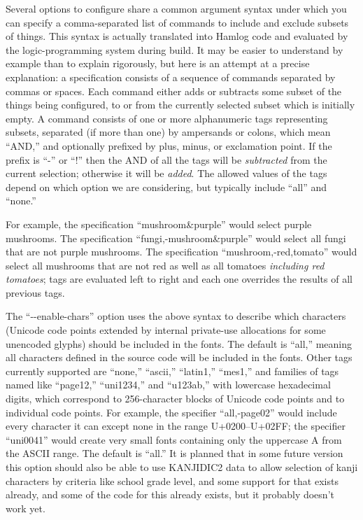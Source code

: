 \documentclass[14pt]{extarticle}
\begin{document}
Several options to configure share a common argument syntax under which you
can specify a comma-separated list of commands to include and exclude
subsets of things.  This syntax is actually translated into Hamlog code and
evaluated by the logic-programming system during build.  It may be easier
to understand by example than to explain rigorously, but here is an attempt
at a precise explanation: a specification consists of a sequence of commands
separated by commas or spaces.  Each command either adds or subtracts some
subset of the things being configured, to or from the currently selected
subset which is initially empty.  A command consists of one or more
alphanumeric tags representing subsets, separated (if more than one) by
ampersands or colons, which mean ``AND,'' and optionally prefixed by plus,
minus, or exclamation point.  If the prefix is ``-'' or ``!'' then the AND
of all the tags will be \emph{subtracted} from the current selection;
otherwise it will be \emph{added}.  The allowed values of the tags depend on
which option we are considering, but typically include ``all'' and ``none.''

For example, the specification ``mushroom\&purple'' would select purple
mushrooms.  The specification ``fungi,-mushroom\&purple'' would select all
fungi that are not purple mushrooms.  The specification
``mushroom,-red,tomato'' would select all mushrooms that are not red as well
as all tomatoes \emph{including red tomatoes}; tags are evaluated left to
right and each one overrides the results of all previous tags.

The ``-{}-enable-chars'' option uses the above syntax to describe which
characters (Unicode code points extended by internal private-use allocations
for some unencoded glyphs) should be included in the fonts.  The default is
``all,'' meaning all characters defined in the source code will be included
in the fonts.  Other tags currently supported are ``none,'' ``ascii,''
``latin1,'' ``mes1,'' and families of tags named like ``page12,''
``uni1234,'' and ``u123ab,'' with lowercase hexadecimal digits, which
correspond to 256-character blocks of Unicode code points and to individual
code points.  For example, the specifier ``all,-page02'' would include every
character it can except none in the range U+0200--U+02FF; the specifier
``uni0041'' would create very small fonts containing only the uppercase A
from the ASCII range.  The default is ``all.'' It is planned that in some
future version this option should also be able to use KANJIDIC2 data to
allow selection of kanji characters by criteria like school grade level, and
some support for that exists already, and some of the code for this already
exists, but it probably doesn't work yet.
\end{document}
